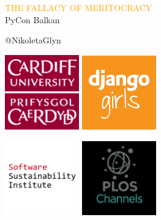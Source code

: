 \documentclass{beamer}
\begin{document}
\begin{frame}
    \begin{center}
        \LARGE{\textcolor{orange}{THE FALLACY OF MERITOCRACY}} \\

        \vspace{1.5cm}
        \normalsize{PyCon Balkan}

        \vspace{1cm}
        \normalsize{@NikoletaGlyn}

    \end{center}
\end{frame}

\begin{frame}
    \begin{center}
    \includegraphics[width=0.24\textwidth]{static/cardiff_uni_logo.png}\hspace{6pt}
    \includegraphics[width=0.24\textwidth, height=0.245\textwidth]{static/django_girls.png}\vspace{10pt}

    \includegraphics[width=0.24\textwidth]{static/ssi-logo.png} \hspace{6pt}
    \includegraphics[width=0.24\textwidth]{static/plos-logo.jpg}

    \end{center}
\end{frame}
\end{document}
